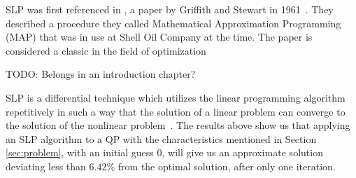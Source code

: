 SLP was first referenced in \cite{slp61}, a paper by Griffith and Stewart in
1961~\cite{boggs1985numerical}.
They described a procedure they called Mathematical Approximation Programming
(MAP) that was in use at Shell Oil Company at the time. The paper is considered
a classic in the field of optimization

TODO: Belongs in an introduction chapter?

SLP is a differential technique which utilizes the linear programming algorithm
repetitively in such a way that the solution of a linear problem can converge
to the solution of the nonlinear problem~\cite{slp61}. The results above show
us that applying an SLP algorithm to a QP with the characteristics mentioned in
Section \ref{sec:problem}, with an initial guess 0, will give us an approximate
solution deviating less than $6.42\%$ from the optimal solution, after only one
iteration.
